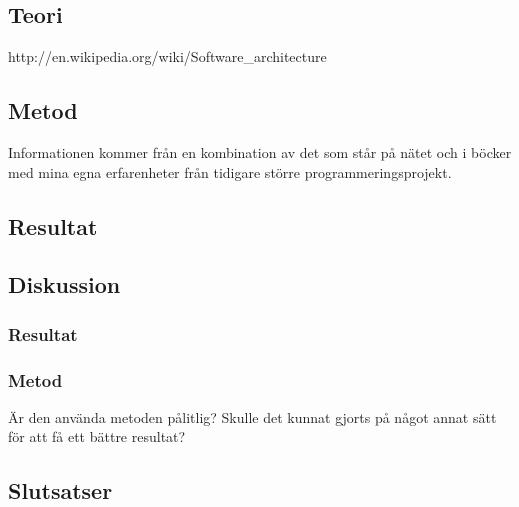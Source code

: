 \subsection{Teori}
http://en.wikipedia.org/wiki/Software\_architecture
\subsection{Metod}
Informationen kommer från en kombination av det som står på nätet och i böcker med mina egna erfarenheter från tidigare större programmeringsprojekt.
\subsection{Resultat}
\subsection{Diskussion}
\subsubsection{Resultat}
\subsubsection{Metod}
Är den använda metoden pålitlig? Skulle det kunnat gjorts på något annat sätt för att få ett bättre resultat?
\subsection{Slutsatser}
